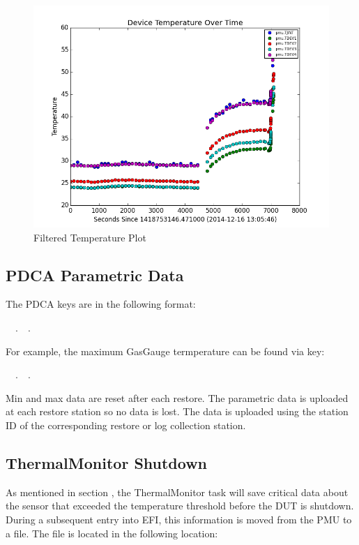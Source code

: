 \begin{figure}[!htb]
\begin{center}
	\includegraphics[scale=0.75]{DeviceTypeStarting}

	\caption{Filtered Temperature Plot}
	\label{fig:FilteredTemperaturePlot}

\end{center}
\end{figure}

\newpage 
\subsection{PDCA Parametric Data}

The PDCA keys are in the following format:

\begin{Setting}
~~.~~.~~
\end{Setting}

For example, the maximum GasGauge termperature can be found via key:

\begin{Setting}
~~.~~.~~
\end{Setting}

Min and max data are reset after each restore. The parametric data is uploaded
at each restore station so no data is lost. The data is uploaded using the
station ID of the corresponding restore or log collection station.

\subsection{ThermalMonitor Shutdown}
\label{sec:ThermalMonitorShutdown}
As mentioned in section , the ThermalMonitor task will save
critical data about the sensor that exceeded the temperature threshold before
the DUT is shutdown. During a subsequent entry into EFI, this information
is moved from the PMU to a file. The file is located in the following location:

